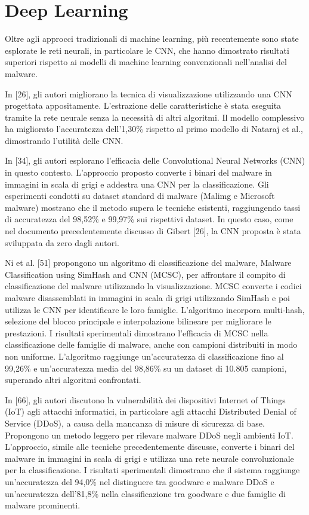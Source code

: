 \section{Deep Learning}
Oltre agli approcci tradizionali di machine learning, più recentemente sono state esplorate le reti neurali, in particolare le CNN, che hanno dimostrato risultati superiori rispetto ai modelli di machine learning convenzionali nell'analisi del malware.

In [26], gli autori migliorano la tecnica di visualizzazione utilizzando una CNN progettata appositamente. L'estrazione delle caratteristiche è stata eseguita tramite la rete neurale senza la necessità di altri algoritmi. Il modello complessivo ha migliorato l'accuratezza dell'1,30\% rispetto al primo modello di Nataraj et al., dimostrando l'utilità delle CNN.

In [34], gli autori esplorano l'efficacia delle Convolutional Neural Networks (CNN) in questo contesto. L'approccio proposto converte i binari del malware in immagini in scala di grigi e addestra una CNN per la classificazione. Gli esperimenti condotti su dataset standard di malware (Malimg e Microsoft malware) mostrano che il metodo supera le tecniche esistenti, raggiungendo tassi di accuratezza del 98,52\% e 99,97\% sui rispettivi dataset. In questo caso, come nel documento precedentemente discusso di Gibert [26], la CNN proposta è stata sviluppata da zero dagli autori.

Ni et al. [51] propongono un algoritmo di classificazione del malware, Malware Classification using SimHash and CNN (MCSC), per affrontare il compito di classificazione del malware utilizzando la visualizzazione. MCSC converte i codici malware disassemblati in immagini in scala di grigi utilizzando SimHash e poi utilizza le CNN per identificare le loro famiglie. L'algoritmo incorpora multi-hash, selezione del blocco principale e interpolazione bilineare per migliorare le prestazioni. I risultati sperimentali dimostrano l'efficacia di MCSC nella classificazione delle famiglie di malware, anche con campioni distribuiti in modo non uniforme. L'algoritmo raggiunge un'accuratezza di classificazione fino al 99,26\% e un'accuratezza media del 98,86\% su un dataset di 10.805 campioni, superando altri algoritmi confrontati.

In [66], gli autori discutono la vulnerabilità dei dispositivi Internet of Things (IoT) agli attacchi informatici, in particolare agli attacchi Distributed Denial of Service (DDoS), a causa della mancanza di misure di sicurezza di base. Propongono un metodo leggero per rilevare malware DDoS negli ambienti IoT. L'approccio, simile alle tecniche precedentemente discusse, converte i binari del malware in immagini in scala di grigi e utilizza una rete neurale convoluzionale per la classificazione. I risultati sperimentali dimostrano che il sistema raggiunge un'accuratezza del 94,0\% nel distinguere tra goodware e malware DDoS e un'accuratezza dell'81,8\% nella classificazione tra goodware e due famiglie di malware prominenti.

